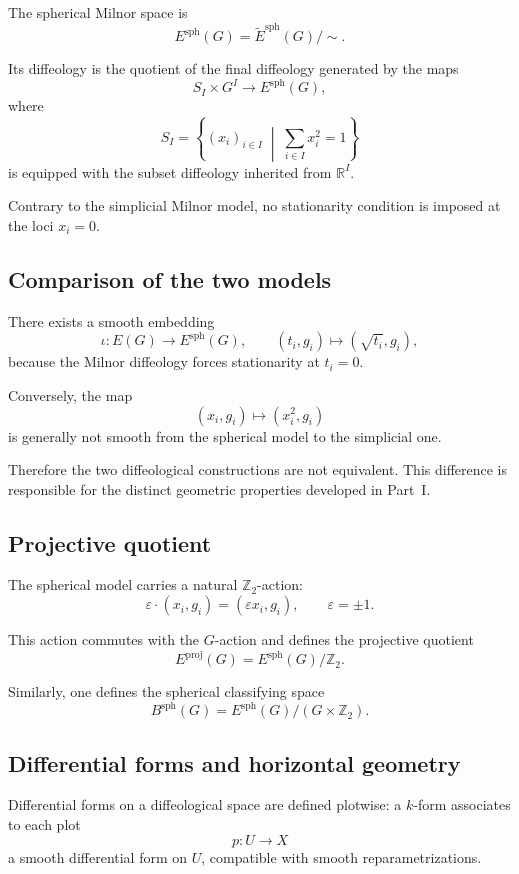 \documentclass[11pt]{amsart}
\begin{document}
The spherical Milnor space is
\[
E^{\mathrm{sph}}(G)
=
\widetilde E^{\mathrm{sph}}(G)/\sim.
\]

Its diffeology is the quotient of the final diffeology generated by the maps
\[
S_I\times G^I
\longrightarrow
E^{\mathrm{sph}}(G),
\]
where
\[
S_I
=
\left\{
(x_i)_{i\in I}
\;\middle|\;
\sum_{i\in I}x_i^2=1
\right\}
\]
is equipped with the subset diffeology inherited from \(\mathbb R^I\).

Contrary to the simplicial Milnor model, no stationarity condition is imposed
at the loci \(x_i=0\).

\subsection{Comparison of the two models}

There exists a smooth embedding
\[
\iota:E(G)\longrightarrow E^{\mathrm{sph}}(G),
\qquad
(t_i,g_i)\mapsto(\sqrt{t_i},g_i),
\]
because the Milnor diffeology forces stationarity at \(t_i=0\).

Conversely, the map
\[
(x_i,g_i)\mapsto(x_i^2,g_i)
\]
is generally not smooth from the spherical model to the simplicial one.

Therefore the two diffeological constructions are not equivalent. This
difference is responsible for the distinct geometric properties developed in
Part~I.

\subsection{Projective quotient}

The spherical model carries a natural \(\mathbb Z_2\)-action:
\[
\varepsilon\cdot(x_i,g_i)
=
(\varepsilon x_i,g_i),
\qquad
\varepsilon=\pm1.
\]

This action commutes with the \(G\)-action and defines the projective quotient
\[
E^{\mathrm{proj}}(G)
=
E^{\mathrm{sph}}(G)/\mathbb Z_2.
\]

Similarly, one defines the spherical classifying space
\[
B^{\mathrm{sph}}(G)
=
E^{\mathrm{sph}}(G)/(G\times\mathbb Z_2).
\]

\subsection{Differential forms and horizontal geometry}

Differential forms on a diffeological space are defined plotwise: a
\(k\)-form associates to each plot
\[
p:U\to X
\]
a smooth differential form on \(U\), compatible with smooth
reparametrizations.
\end{document}
